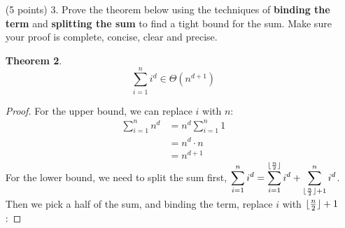 \documentclass[paper=a4, fontsize=11pt]{scrartcl}
\DeclarePairedDelimiter\floor{\lfloor}{\rfloor}
\DeclarePairedDelimiter\ceil{\lceil}{\rceil}
\newtheorem{theorem}{Theorem}
\numberwithin{equation}{section}		%
\numberwithin{figure}{section}			%
\numberwithin{table}{section}				%
\begin{document}
\begin{enumerate}
\begin{theorem}
\[
\sum_{i=1}^{\log_2n}i \in \Theta\left((\log_2n)^2\right)
\]
\end{theorem}
\begin{proof}
	For the upper bound, we can replace $i$ with $\log_2n$:
	
	\begin{align*}
		\sum_{i=1}^{\log_2n}\log_2n &= \log_2n \sum_{i=1}^{\log_2n}1 \\
		&=\log_2n \cdot \log_2n \\
		&= (\log_2n)^2
	\end{align*}
	For the lower bound, we need to split the sum first, $\displaystyle\sum_{i=1}^{\log_2n}i = \sum_{i=1}^{\floor{\frac{\log_2n}{2}}}i + \sum_{i=\floor{\frac{\log_2n}{2}} + 1}^{\log_2n}i$. Then we pick a half of the sum, and binding the term, replace $i$ with $\floor{\frac{\log_2n}{2}} + 1$:
	\begin{align*}
		\sum_{i=\floor{\frac{\log_2n}{2}} + 1}^{\log_2n} (\floor{\frac{\log_2n}{2}} + 1) &= (\floor{\frac{\log_2n}{2}} + 1) \cdot (\log_2n - \floor{\frac{\log_2n}{2}} - 1 + 1)\\
		&= (\floor{\frac{\log_2n}{2}} + 1)(\ceil{\frac{\log_2n}{2}}) \\
		&\geq (\frac{\log_2n}{2})(\frac{\log_2n}{2}) \\
		&= (\frac{\log_2n}{2})^2
	\end{align*}
	Hence, the tight bound is $(\frac{\log_2n}{2})^2 \leq \sum_{i=1}^{\log_2n}i \leq (\log_2n)^2$. We get $\sum_{i=1}^{\log_2n}i \in \Theta\left((\log_2n)^2\right)$.
\end{proof}

\item [(5 points) 3.] Prove the theorem below using the techniques of \textbf{binding the term} and \textbf{splitting the sum} to find a tight bound for the sum.  Make sure your proof is complete, concise, clear and precise.

\begin{theorem}
\[
\sum_{i=1}^{n}i^d \in \Theta\left(n^{d+1}\right)
\]
\end{theorem}
\begin{proof}
	For the upper bound, we can replace $i$ with $n$:
	\begin{align*}
		\sum_{i=1}^{n}n^d &= n^d \sum_{i=1}^{n}1 \\
		&= n^d \cdot n \\
		&= n^{d+1}
	\end{align*}
	For the lower bound, we need to split the sum first, $\displaystyle\sum_{i=1}^{n}i^d = \sum_{i=1}^{\floor{\frac{n}{2}}} i^d + \sum_{\floor{\frac{n}{2}} + 1}^{n}i^d$. Then we pick a half of the sum, and binding the term, replace $i$ with $\floor{\frac{n}{2}} + 1$:
	

\end{proof}
\end{enumerate}
\end{document}
